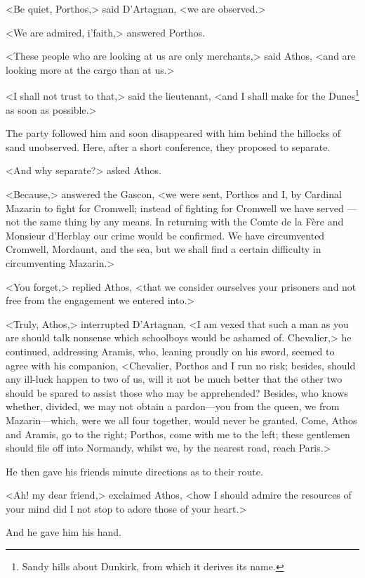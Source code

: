 <Be quiet, Porthos,> said D'Artagnan, <we are observed.>

<We are admired, i'faith,> answered Porthos.

<These people who are looking at us are only merchants,> said Athos, <and are looking more at the cargo than at us.>

<I shall not trust to that,> said the lieutenant, <and I shall make for the Dunes\footnote{Sandy hills about Dunkirk, from which it derives its name.} as soon as possible.>

The party followed him and soon disappeared with him behind the hillocks of sand unobserved. Here, after a short conference, they proposed to separate.

<And why separate?> asked Athos.

<Because,> answered the Gascon, <we were sent, Porthos and I, by Cardinal Mazarin to fight for Cromwell; instead of fighting for Cromwell we have served —not the same thing by any means. In returning with the Comte de la Fère and Monsieur d'Herblay our crime would be confirmed. We have circumvented Cromwell, Mordaunt, and the sea, but we shall find a certain difficulty in circumventing Mazarin.>

<You forget,> replied Athos, <that we consider ourselves your prisoners and not free from the engagement we entered into.>

<Truly, Athos,> interrupted D'Artagnan, <I am vexed that such a man as you are should talk nonsense which schoolboys would be ashamed of. Chevalier,> he continued, addressing Aramis, who, leaning proudly on his sword, seemed to agree with his companion, <Chevalier, Porthos and I run no risk; besides, should any ill-luck happen to two of us, will it not be much better that the other two should be spared to assist those who may be apprehended? Besides, who knows whether, divided, we may not obtain a pardon—you from the queen, we from Mazarin—which, were we all four together, would never be granted. Come, Athos and Aramis, go to the right; Porthos, come with me to the left; these gentlemen should file off into Normandy, whilst we, by the nearest road, reach Paris.>

He then gave his friends minute directions as to their route.

<Ah! my dear friend,> exclaimed Athos, <how I should admire the resources of your mind did I not stop to adore those of your heart.>

And he gave him his hand.

